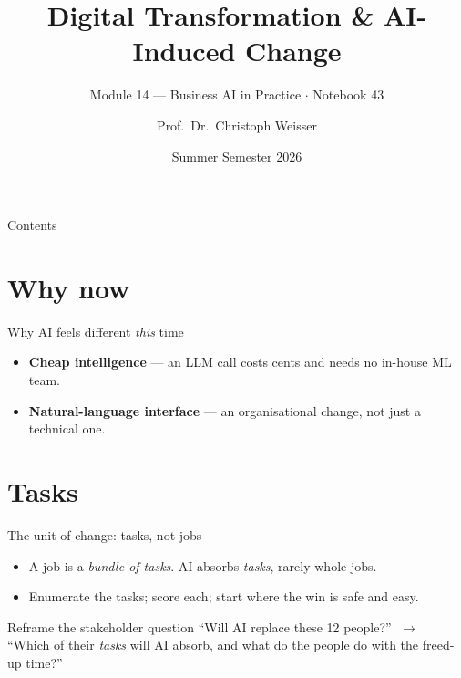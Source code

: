 \documentclass[aspectratio=169,11pt]{beamer}
\title{Digital Transformation \& AI-Induced Change}
\subtitle{Module 14 --- Business AI in Practice $\cdot$ Notebook 43}
\author{Prof.\ Dr.\ Christoph Weisser}
\institute{HSBI}
\date{Summer Semester 2026}
\begin{document}
\begin{frame}\titlepage\end{frame}

\begin{frame}{Contents}
  \tableofcontents[hideallsubsections]
\end{frame}

\section{Why now}
\begin{frame}{Why AI feels different \emph{this} time}
  \begin{center}
  \end{center}
  \begin{itemize}
    \item \textbf{Cheap intelligence} --- an LLM call costs cents and needs no in-house ML team.
    \item \textbf{Natural-language interface} --- an organisational change, not just a technical one.
  \end{itemize}
\end{frame}

\section{Tasks}
\begin{frame}{The unit of change: tasks, not jobs}
  \begin{itemize}
    \item A job is a \emph{bundle of tasks}. AI absorbs \emph{tasks}, rarely whole jobs.
    \item Enumerate the tasks; score each; start where the win is safe and easy.
  \end{itemize}
  \begin{exampleblock}{Reframe the stakeholder question}
    ``Will AI replace these 12 people?'' $\;\to\;$ ``Which of their \emph{tasks} will AI absorb, and what do the people do with the freed-up time?''
  \end{exampleblock}
\end{frame}
\end{document}
